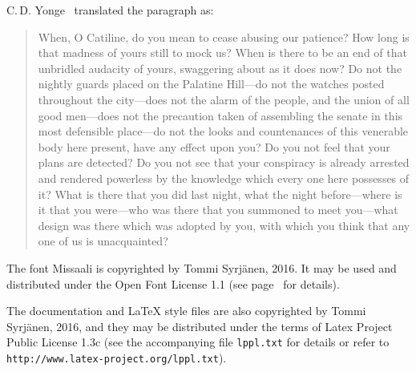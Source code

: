 \documentclass[a4paper, 12pt]{article}
\begin{document}
C.\,D. Yonge~\cite{yonge} translated the paragraph as:

 \begin{quote}
   When, O Catiline, do you mean to cease abusing our patience? How
   long is that madness of yours still to mock us? When is there to be
   an end of that unbridled audacity of yours, swaggering about as it
   does now? Do not the nightly guards placed on the Palatine Hill—do
   not the watches posted throughout the city—does not the alarm of the
   people, and the union of all good men—does not the precaution taken
   of assembling the senate in this most defensible place—do not the
   looks and countenances of this venerable body here present, have any
   effect upon you? Do you not feel that your plans are detected? Do
   you not see that your conspiracy is already arrested and rendered
   powerless by the knowledge which every one here possesses of it?
   What is there that you did last night, what the night before—where
   is it that you were—who was there that you summoned to meet
   you—what design was there which was adopted by you, with which you
   think that any one of us is unacquainted?
 \end{quote}


\vfill


The font Missaali is copyrighted by Tommi Syrjänen, 2016. It may be
used and distributed under the Open Font License 1.1 (see
page~\pageref{pg_license} for details).

The documentation and LaTeX style files are also copyrighted by Tommi
Syrjänen, 2016, and they may be distributed under the terms of Latex
Project Public License 1.3c (see the accompanying file
\texttt{lppl.txt} for details or refer to
\texttt{http://www.latex-project.org/lppl.txt}). 

\newpage
\end{document}
